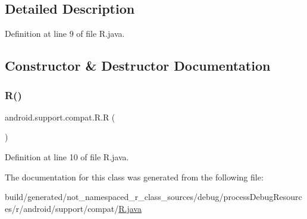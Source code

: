 \subsection{Detailed Description}


Definition at line 9 of file R.\+java.



\subsection{Constructor \& Destructor Documentation}
\mbox{\label{classandroid_1_1support_1_1compat_1_1_r_a5ccf4b4efeb034ade53739f6a3deee4d}} 
\subsubsection{\texorpdfstring{R()}{R()}}
{\footnotesize\ttfamily android.\+support.\+compat.\+R.\+R (\begin{DoxyParamCaption}{ }\end{DoxyParamCaption})\hspace{0.3cm}{\ttfamily [private]}}



Definition at line 10 of file R.\+java.


\begin{DoxyCode}{0}

\end{DoxyCode}


The documentation for this class was generated from the following file\+:\begin{DoxyCompactItemize}
\item 
build/generated/not\+\_\+namespaced\+\_\+r\+\_\+class\+\_\+sources/debug/process\+Debug\+Resources/r/android/support/compat/\mbox{\hyperlink{android_2support_2compat_2_r_8java}{R.\+java}}\end{DoxyCompactItemize}
